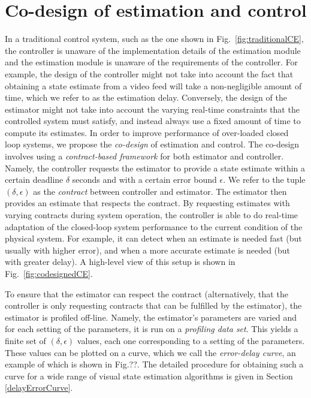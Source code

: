\section{Co-design of estimation and control}
\label{sec:codesign}

In a traditional control system, such as the one shown in Fig.~\ref{fig:traditionalCE}, the controller is unaware of the implementation details of the estimation module and the estimation module is unaware of the requirements of the controller.
For example, the design of the controller might not take into account the fact that obtaining a state estimate from a video feed will take a non-negligible amount of time, which we refer to as the estimation delay.
Conversely, the design of the estimator might not take into account the varying real-time constraints that the controlled system must satisfy, and instead always use a fixed amount of time to compute its estimates.
In order to improve performance of over-loaded closed loop systems, we propose the \emph{co-design} of estimation and control.
The co-design involves using a \emph{contract-based framework} for both estimator and controller.
Namely, the controller requests the estimator to provide a state estimate within a certain deadline $\delta$ seconds and with a certain error bound $\epsilon$.
We refer to the tuple $(\delta,\epsilon)$ as the \emph{contract} between controller and estimator.
The estimator then provides an estimate that respects the contract.
By requesting estimates with varying contracts during system operation, the controller is able to do real-time adaptation of the closed-loop system performance to the current condition of the physical system.
For example, it can detect when an estimate is needed fast (but usually with higher error), and when a more accurate estimate is needed (but with greater delay).
A high-level view of this setup is shown in Fig.~\ref{fig:codesignedCE}.

To ensure that the estimator can respect the contract (alternatively, that the controller is only requesting contracts that can be fulfilled by the estimator), the estimator is profiled off-line.
Namely, the estimator's parameters are varied and for each setting of the parameters, it is run on a \emph{profiling data set}. 
This yields a finite set of $(\delta,\epsilon)$ values, each one corresponding to a setting of the parameters.
These values can be plotted on a curve, which we call the \emph{error-delay curve}, an example of which is shown in Fig.??.
The detailed procedure for obtaining such a curve for a wide range of visual state estimation algorithms is given in Section \ref{delayErrorCurve}.

